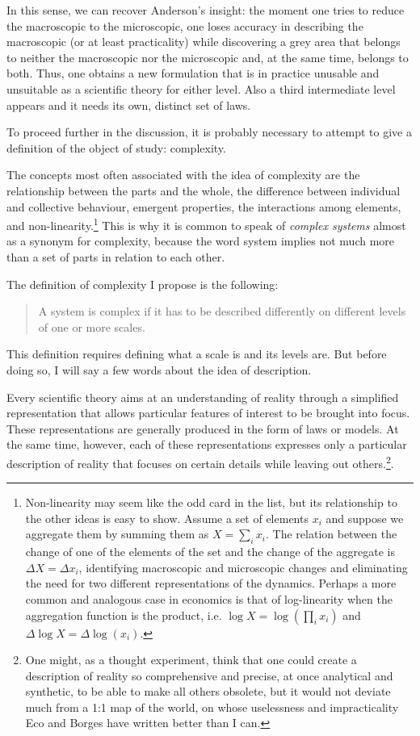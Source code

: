 \documentclass[a4paper, headings=standardclasses]{scrartcl}
\begin{document}
In this sense, we can recover Anderson's insight: the moment one tries to reduce the macroscopic to the microscopic, one loses accuracy in describing the macroscopic (or at least practicality) while discovering a grey area that belongs to neither the macroscopic nor the microscopic and, at the same time, belongs to both.
Thus, one obtains a new formulation that is in practice unusable and unsuitable as a scientific theory for either level. Also a third intermediate level appears and it needs its own, distinct set of laws.

To proceed further in the discussion, it is probably necessary to attempt to give a definition of the object of study: complexity.

The concepts most often associated with the idea of complexity are the relationship between the parts and the whole, the difference between individual and collective behaviour, emergent properties, the interactions among elements, and non-linearity.\footnote{Non-linearity may seem like the odd card in the list, but its relationship to the other ideas is easy to show. Assume a set of elements ${x_i}$ and suppose we aggregate them by summing them as $X=\sum_i x_i$. The relation between the change of one of the elements of the set and the change of the aggregate is $\Delta X=\Delta x_i$, identifying macroscopic and microscopic changes and eliminating the need for two different representations of the dynamics. Perhaps a more common and analogous case in economics is that of log-linearity when the aggregation function is the product, i.e. $\log X = \log(\prod_i x_i)$ and $\Delta \log X=\Delta\log(x_i)$.} This is why it is common to speak of \textit{complex systems} almost as a synonym for complexity, because the word system implies not much more than a set of parts in relation to each other.

The definition of complexity I propose is the following:
\begin{quote}
A system is complex if it has to be described differently on different levels of one or more scales.
\end{quote}

This definition requires defining what a scale is and its levels are. But before doing so, I will say a few words about the idea of description.

Every scientific theory aims at an understanding of reality through a simplified representation that allows particular features of interest to be brought into focus. These representations are generally produced in the form of laws or models.
At the same time, however, each of these representations expresses only a particular description of reality that focuses on certain details while leaving out others.\footnote{One might, as a thought experiment, think that one could create a description of reality so comprehensive and precise, at once analytical and synthetic, to be able to make all others obsolete, but it would not deviate much from a 1:1 map of the world, on whose uselessness and impracticality Eco and Borges have written better than I can.}.
\end{document}
